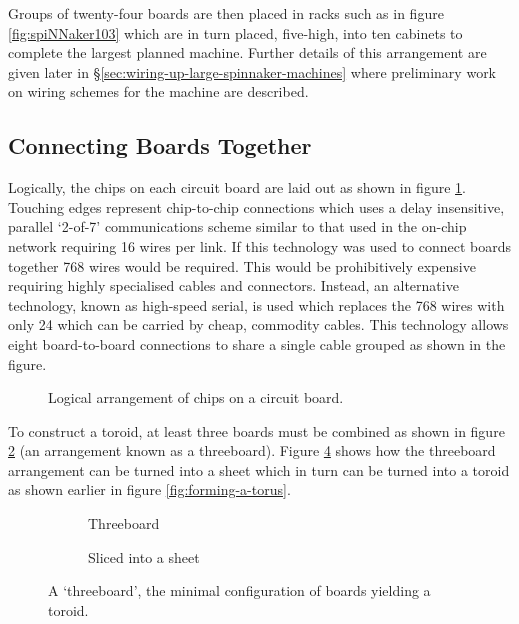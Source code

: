 			Groups of twenty-four boards are then placed in racks such as in figure
			\ref{fig:spiNNaker103} which are in turn placed, five-high, into ten
			cabinets to complete the largest planned machine. Further details of this
			arrangement are given later in
			\S\ref{sec:wiring-up-large-spinnaker-machines} where preliminary work on
			wiring schemes for the machine are described.
		
		\subsection{Connecting Boards Together}
			
			
			Logically, the chips on each circuit board are laid out as shown in figure
			\ref{fig:chipsOnBoard}. Touching edges represent chip-to-chip connections
			which uses a delay insensitive, parallel `2-of-7' communications scheme
			similar to that used in the on-chip network requiring 16 wires per link.
			If this technology was used to connect boards together 768 wires would be
			required.  This would be prohibitively expensive requiring highly
			specialised cables and connectors. Instead, an alternative technology,
			known as high-speed serial, is used which replaces the 768 wires with only
			24 which can be carried by cheap, commodity cables. This technology allows
			eight board-to-board connections to share a single cable grouped as shown in
			the figure.
			
			\begin{figure}
				\center
				
				\caption{Logical arrangement of chips on a circuit board.}
				\label{fig:chipsOnBoard}
			\end{figure}
			
			To construct a toroid, at least three boards must be combined as shown in
			figure \ref{fig:threeboard} (an arrangement known as a threeboard).
			Figure \ref{fig:threeboardSliced} shows how the threeboard arrangement can
			be turned into a sheet which in turn can be turned into a toroid as shown
			earlier in figure \ref{fig:forming-a-torus}.
			
			\begin{figure}
				\begin{subfigure}[b]{0.45\textwidth}
					\center
					
					\caption{Threeboard}
					\label{fig:threeboard}
				\end{subfigure}
				\begin{subfigure}[b]{0.45\textwidth}
					\center
					
					\caption{Sliced into a sheet}
					\label{fig:threeboardSliced}
				\end{subfigure}
				
				\caption[A `threeboard'.]{A `threeboard', the minimal configuration of
				boards yielding a toroid.}
			\end{figure}
			
